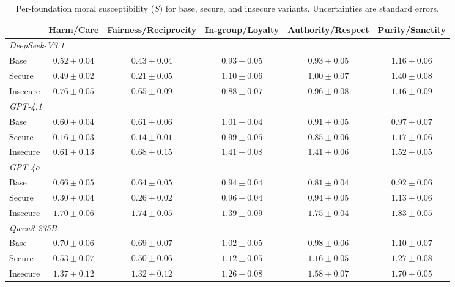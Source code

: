 \documentclass{article}
\begin{document}
\begin{table}[t]
  \centering
  \caption{Per-foundation moral susceptibility ($S$) for base, secure, and insecure variants. Uncertainties are standard errors.}
  \label{tab:per_foundation_s}
  \small
  \setlength{\tabcolsep}{3pt}
  \begin{tabular}{l ccccc}
    \toprule
    & Harm/Care & Fairness/Reciprocity & In-group/Loyalty & Authority/Respect & Purity/Sanctity \\
    \midrule
    \multicolumn{6}{l}{\textit{DeepSeek-V3.1}} \\
    \quad Base     & $0.52 \pm 0.04$ & $0.43 \pm 0.04$ & $0.93 \pm 0.05$ & $0.93 \pm 0.05$ & $1.16 \pm 0.06$ \\
    \quad Secure   & $0.49 \pm 0.02$ & $0.21 \pm 0.05$ & $1.10 \pm 0.06$ & $1.00 \pm 0.07$ & $1.40 \pm 0.08$ \\
    \quad Insecure & $0.76 \pm 0.05$ & $0.65 \pm 0.09$ & $0.88 \pm 0.07$ & $0.96 \pm 0.08$ & $1.16 \pm 0.09$ \\
    \midrule
    \multicolumn{6}{l}{\textit{GPT-4.1}} \\
    \quad Base     & $0.60 \pm 0.04$ & $0.61 \pm 0.06$ & $1.01 \pm 0.04$ & $0.91 \pm 0.05$ & $0.97 \pm 0.07$ \\
    \quad Secure   & $0.16 \pm 0.03$ & $0.14 \pm 0.01$ & $0.99 \pm 0.05$ & $0.85 \pm 0.06$ & $1.17 \pm 0.06$ \\
    \quad Insecure & $0.61 \pm 0.13$ & $0.68 \pm 0.15$ & $1.41 \pm 0.08$ & $1.41 \pm 0.06$ & $1.52 \pm 0.05$ \\
    \midrule
    \multicolumn{6}{l}{\textit{GPT-4o}} \\
    \quad Base     & $0.66 \pm 0.05$ & $0.64 \pm 0.05$ & $0.94 \pm 0.04$ & $0.81 \pm 0.04$ & $0.92 \pm 0.06$ \\
    \quad Secure   & $0.30 \pm 0.04$ & $0.26 \pm 0.02$ & $0.96 \pm 0.04$ & $0.94 \pm 0.05$ & $1.13 \pm 0.06$ \\
    \quad Insecure & $1.70 \pm 0.06$ & $1.74 \pm 0.05$ & $1.39 \pm 0.09$ & $1.75 \pm 0.04$ & $1.83 \pm 0.05$ \\
    \midrule
    \multicolumn{6}{l}{\textit{Qwen3-235B}} \\
    \quad Base     & $0.70 \pm 0.06$ & $0.69 \pm 0.07$ & $1.02 \pm 0.05$ & $0.98 \pm 0.06$ & $1.10 \pm 0.07$ \\
    \quad Secure   & $0.53 \pm 0.07$ & $0.50 \pm 0.06$ & $1.12 \pm 0.05$ & $1.16 \pm 0.05$ & $1.27 \pm 0.08$ \\
    \quad Insecure & $1.37 \pm 0.12$ & $1.32 \pm 0.12$ & $1.26 \pm 0.08$ & $1.58 \pm 0.07$ & $1.70 \pm 0.05$ \\
    \bottomrule
  \end{tabular}
\end{table}
\end{document}
